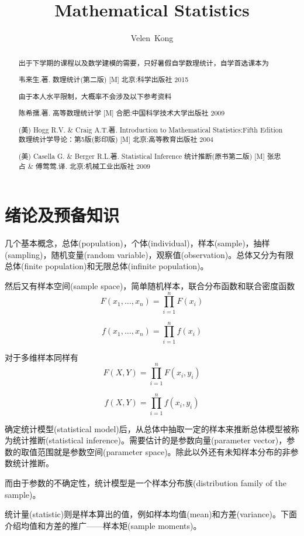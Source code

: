\documentclass[UTF8]{ctexart}
\begin{document}
\pagestyle{headings}
\title{Mathematical Statistics}
\author{Velen~Kong
}
\maketitle
\begin{abstract}
出于下学期的课程以及数学建模的需要，只好暑假自学数理统计，自学首选课本为

韦来生.著. 数理统计(第二版) [M] 北京:科学出版社 2015

由于本人水平限制，大概率不会涉及以下参考资料

陈希孺.著. 高等数理统计学 [M] 合肥:中国科学技术大学出版社 2009

(美) Hogg R.V. \& Craig A.T.著. Introduction to Mathematical Statistics:Fifth Edition 数理统计学导论：第5版(影印版) [M] 北京:高等教育出版社 2004

(美) Casella G. \& Berger R.L.著. Statistical Inference 统计推断(原书第二版) [M] 张忠占 \& 傅莺莺.译. 北京:机械工业出版社 2009\\
\end{abstract}

\section{绪论及预备知识}

几个基本概念，总体(population)，个体(individual)，样本(sample)，抽样(sampling)，随机变量(random variable)，观察值(observation)。总体又分为有限总体(finite population)和无限总体(infinite population)。

然后又有样本空间(sample space)，简单随机样本，联合分布函数和联合密度函数
$$F(x_{1},\ldots ,x_{n})=\prod_{i=1}^{n}F(x_{i})$$

$$f(x_{1},\ldots ,x_{n})=\prod_{i=1}^{n}f(x_{i})$$

对于多维样本同样有
$$F(X,Y)=\prod_{i=1}^{n}F(x_{i},y_{i})$$

$$f(X,Y)=\prod_{i=1}^{n}f(x_{i},y_{i})$$

确定统计模型(statistical model)后，从总体中抽取一定的样本来推断总体模型被称为统计推断(statistical inference)。需要估计的是参数向量(parameter vector)，参数的取值范围就是参数空间(parameter space)。除此以外还有未知样本分布的非参数统计推断。

而由于参数的不确定性，统计模型是一个样本分布族(distribution family of the sample)。

统计量(statistic)则是样本算出的值，例如样本均值(mean)和方差(variance)。下面介绍均值和方差的推广——样本矩(sample moments)。
\end{document}

